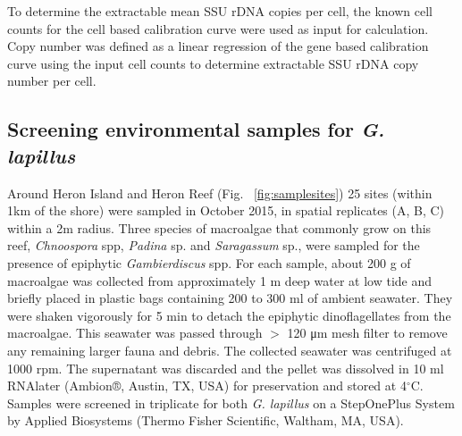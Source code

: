 \documentclass[12pt]{article}
\begin{document}
To determine the extractable mean SSU rDNA copies per cell, the known cell counts for the cell based calibration curve were used as input for calculation. 
Copy number was defined as a linear regression of the gene based calibration curve using the input cell counts to determine extractable SSU rDNA copy number per cell.

\subsection*{Screening environmental samples for \emph{G. lapillus}}%
\FloatBarrier
Around Heron Island and Heron Reef (Fig. ~\ref{fig:samplesites}) 25 sites (within 1km of the shore) were sampled in October 2015, in spatial replicates (A, B, C) within a 2m radius. 
Three species of macroalgae that commonly grow on this reef, \textit{Chnoospora} spp, \textit{Padina} sp. and \textit{Saragassum} sp., were sampled for the presence of epiphytic \emph{Gambierdiscus} spp. For each sample, about 200 g of macroalgae was collected from approximately 1 m deep water at low tide and briefly placed in plastic bags containing 200 to 300 ml of ambient seawater. 
They were shaken vigorously for 5 min to detach the epiphytic dinoflagellates from the macroalgae. 
This seawater was passed through $>$ 120 μm mesh filter to remove any remaining larger fauna and debris. 
The collected seawater was centrifuged at 1000 rpm. The supernatant was discarded and the pellet was dissolved in 10 ml RNAlater (Ambion®, Austin, TX, USA) for preservation and stored at 4$^{\circ}$C.
Samples were screened in triplicate for both \emph{G. lapillus} %
on a StepOnePlus System by Applied Biosystems (Thermo Fisher Scientific, Waltham, MA, USA).
\end{document}
